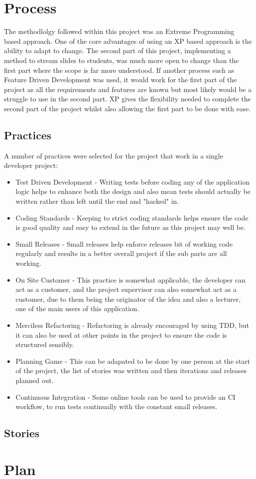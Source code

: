 \section{Process}
The methodlolgy followed within this project was an Extreme Programming based approach. One of the core advantages of using an XP based approach is the ability to adapt to change. The second part of this project, implementing a method to stream slides to students, was much more open to change than the first part where the scope is far more understood. If another process such as Feature Driven Development was used, it would work for the first part of the project as all the requirements and features are known but most likely would be a struggle to use in the second part. XP gives the flexibility needed to complete the second part of the project whilst also allowing the first part to be done with ease.
\subsection{Practices}
A number of practices were selected for the project that work in a single developer project:
\begin{itemize}
	\item Test Driven Development - Writing tests before coding any of the application logic helps to enhance both the design and also mean tests should actually be written rather than left until the end and "hacked" in.
	\item Coding Standards - Keeping to strict coding standards helps ensure the code is good quality and easy to extend in the future as this project may well be.
	\item Small Releases - Small releases help enforce releases bit of working code regularly and results in a better overall project if the sub parts are all working.
	\item On Site Customer - This practice is somewhat applicable, the developer can act as a customer, and the project supervisor can also somewhat act as a customer, due to them being the originator of the idea and also a lecturer, one of the main users of this application.
	\item Merciless Refactoring - Refactoring is already encouraged by using TDD, but it can also be used at other points in the project to ensure the code is structured sensibly.
	\item Planning Game - This can be adapated to be done by one person at the start of the project, the list of stories was written and then iterations and releases planned out.
	\item Continuous Integration - Some online tools can be used to provide an CI workflow, to run tests continually with the constant small releases.
\end{itemize}
\subsection{Stories}

\section{Plan}
